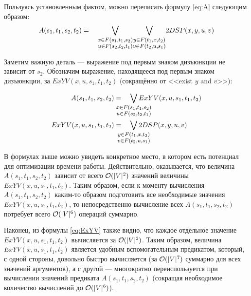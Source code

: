 Пользуясь установленным фактом, можно переписать формулу \eqref{eq:A} следующим образом:
\begin{equation} 
    A(s_1, t_1, s_2, t_2) = \quad
        {\bigvee_{
        \large \substack{
            x \in F(s_1, t_1, s_2)\\ 
            u \in F(s_2, t_2, t_1) 
        }
        }}
        {\bigvee_{
        \large \substack{
            y \in F(t_1, x, t_2)\\ 
            v \in F(t_2, u, s_1) 
        }
        }} 2DSP(x, y, u, v)
\end{equation}

Заметим важную деталь --- выражение под первым знаком дизъюнкции не зависит от $s_2$. Обозначим выражение, находящееся под первым знаком дизъюнкции, за $ExYV(x, u, s_1, t_1, t_2)$ (сокращённо от <<exist $y$ and $v$>>):

\begin{align} \label{eq:ExYV}
    A(s_1, t_1, s_2, t_2) &= \quad
       \smashoperator{\bigvee_{
        \large \substack{
            x \in F(s_1, t_1, s_2)\\ 
            u \in F(s_2, t_2, t_1) 
        }
        }} ExYV(x, u, s_1, t_1, t_2) \\
    ExYV(x, u, s_1, t_1, t_2) &= \quad
        \smashoperator{\bigvee_{
        \large \substack{
            y \in F(t_1, x, t_2)\\ 
            v \in F(t_2, u, s_1) 
        }
        }} 2DSP(x, y, u, v) \\ 
\end{align}

В формулах выше можно увидеть конкретное место, в котором есть потенциал для оптимизации времени работы. Действительно, оказывается, что величина $A(s_1, t_1, s_2, t_2)$ зависит от всего $\mathcal{O}(|V|^2)$ значений величины $ExYV(x, u, s_1, t_1, t_2)$. Таким образом, если к моменту вычисления $A(s_1, t_1, s_2, t_2)$ каким-то образом подготовить все необходимые значения $ExYV(x, u, s_1, t_1, t_2)$, то непосредственно вычисление всех $A(s_1, t_1, s_2, t_2)$ потребует всего $\mathcal{O}(|V|^6)$ операций суммарно.

Наконец, из формулы \eqref{eq:ExYV} также видно, что каждое отдельное значение $ExYV(x, u, s_1, t_1, t_2)$ вычисляется за $\mathcal{O}(|V|^2)$. Таким образом, величина $ExYV(x, u, s_1, t_1, t_2)$ является удобным вспомогательным предикатом, который, с одной стороны, довольно быстро вычисляется (за $\mathcal{O}(|V|^7)$ суммарно для всех значений аргументов), а с другой --- многократно переиспользуется при вычислении значений предиката $A(s_1, t_1, s_2, t_2)$ (сокращая необходимое количество вычислений до $\mathcal{O}(|V|^6)$).

